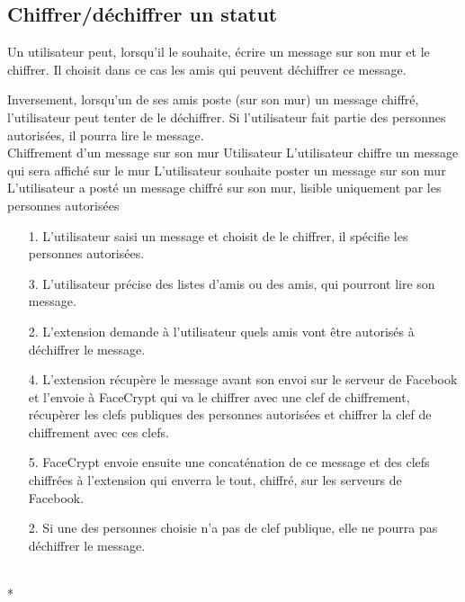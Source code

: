 \documentclass[a4paper,11pt,french]{article}
\begin{document}
\subsection{Chiffrer/déchiffrer un statut}
Un utilisateur peut, lorsqu'il le souhaite, écrire un message
sur son mur et le chiffrer. Il choisit dans ce cas les amis
qui peuvent déchiffrer ce message.

Inversement, lorsqu'un de ses amis poste (sur son mur) un message chiffré,
l'utilisateur peut tenter de le déchiffrer. Si l'utilisateur
fait partie des personnes autorisées, il pourra lire le message.\\

\fiche
	{Chiffrement d'un message sur son mur}
	{Utilisateur}
	{L'utilisateur chiffre un message qui sera affiché sur le mur}
	{}
	{L'utilisateur souhaite poster un message sur son mur}
	{L'utilisateur a posté un message chiffré sur son mur, lisible uniquement par les personnes autorisées}
	{\begin{itemize}
	    \item[]
	  \item[1.] L'utilisateur saisi un message et choisit de le chiffrer,
          il spécifie les personnes autorisées.
      \item[3.] L'utilisateur précise des listes d'amis ou des amis, 
          qui pourront lire son message.
	\end{itemize}
	}
	{\begin{itemize}
        \item[]
        \item[2.] L'extension demande à l'utilisateur quels amis vont être
            autorisés à déchiffrer le message.
		\item[4.] L'extension récupère le message avant son envoi sur le serveur 
            de Facebook et l'envoie à FaceCrypt qui va le chiffrer avec une clef 
        de chiffrement, récupèrer les clefs publiques des personnes autorisées 
        et chiffrer la clef de chiffrement avec ces clefs.
		\item[5.] FaceCrypt envoie ensuite une concaténation de 
        ce message et des clefs chiffrées à l'extension qui enverra le tout,
        chiffré, sur les serveurs de Facebook.
	\end{itemize}
    }
	{}
\flots
    {}
    {\begin{itemize}
    \item[]
    \item[2.] Si une des personnes choisie n'a pas de clef publique,
        elle ne pourra pas déchiffrer le message.
    \end{itemize}
    }
    {}
\\*
\end{document}
